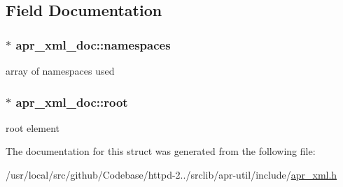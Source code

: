 \subsection{Field Documentation}
\subsubsection[{\texorpdfstring{namespaces}{namespaces}}]{$\ast$ apr\+\_\+xml\+\_\+doc\+::namespaces}\hypertarget{structapr__xml__doc_a6aee4d0e4516c9b8191ad734c2748d39}{}\label{structapr__xml__doc_a6aee4d0e4516c9b8191ad734c2748d39}
array of namespaces used 
\subsubsection[{\texorpdfstring{root}{root}}]{$\ast$ apr\+\_\+xml\+\_\+doc\+::root}\hypertarget{structapr__xml__doc_a9385ccf062ed6997d2d59d80cda28a71}{}\label{structapr__xml__doc_a9385ccf062ed6997d2d59d80cda28a71}
root element 

The documentation for this struct was generated from the following file\+:\begin{DoxyCompactItemize}
\item 
/usr/local/src/github/\+Codebase/httpd-\/2../srclib/apr-\/util/include/\hyperlink{apr__xml_8h}{apr\+\_\+xml.\+h}\end{DoxyCompactItemize}
